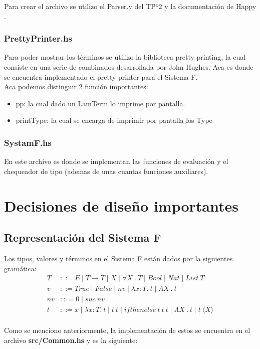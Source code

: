 \documentclass[12pt, titlepage, a4paper]{article}
\begin{document}
Para crear el archivo se utilizo el Parser.y del TPº2 \cite{tp2:lambdaCalculoSimpleTipado} y la documentación de Happy \cite{haskellHappy}.

\subsubsection{PrettyPrinter.hs}
Para poder mostrar los términos se utilizo la biblioteca pretty printing, la cual consiste en una serie de combinados desarrollada por John Hughes. Aca es 
donde se encuentra implementado el pretty printer para el Sistema F. \\
Aca podemos distinguir 2 función importantes:
\begin{itemize}[label=$\bullet$]
  \item {pp: la cual dado un LamTerm lo imprime por pantalla.}
  \item {printType: la cual se encarga de imprimir por pantalla los Type}
\end{itemize}

\subsubsection{SystamF.hs}
En este archivo es donde se implementan las funciones de evaluación y el chequeador de tipo (ademas de unas cuantas funciones auxiliares).

\section{Decisiones de diseño importantes}
\subsection{Representación del Sistema F}
\noindent Los tipos, valores y términos en el Sistema F están dados por la siguientes gramática:
\begin{align*}
    T &::= E \mid T \rightarrow T \mid X \mid \forall X \ . \ T \mid Bool \mid Nat \mid List \ T\\
    v &::= True \mid False \mid nv \mid \lambda x:T. \ t \mid \Lambda X \ . \ t \\
    nv &:: = 0 \mid suc \ nv \\
    t &::= x \mid \lambda x:T. \ t \mid t \ t \mid ifthenelse \ t \ t \ t \mid \Lambda X \ . \ t \mid t \ \langle X \rangle \\
\end{align*}

Como se menciono anteriormente, la implementación de estos se encuentra en el archivo \textbf{src/Common.hs} y es la siguiente:
\end{document}
